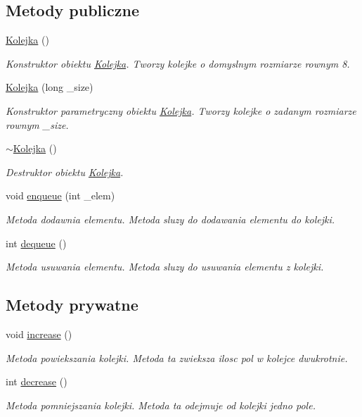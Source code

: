 \subsection*{Metody publiczne}
\begin{DoxyCompactItemize}
\item 
\hyperlink{class_kolejka_a37c886fdc73dce62b04da0381dec5484}{Kolejka} ()
\begin{DoxyCompactList}\small\item\em Konstruktor obiektu \hyperlink{class_kolejka}{Kolejka}. Tworzy kolejke o domyslnym rozmiarze rownym 8. \end{DoxyCompactList}\item 
\hyperlink{class_kolejka_ac942cc97bf0d2c30d11611c406acc5a8}{Kolejka} (long \-\_\-size)
\begin{DoxyCompactList}\small\item\em Konstruktor parametryczny obiektu \hyperlink{class_kolejka}{Kolejka}. Tworzy kolejke o zadanym rozmiarze rownym \-\_\-size. \end{DoxyCompactList}\item 
\hyperlink{class_kolejka_a352f86ff08cd47be6c35c60bb0f873a6}{$\sim$\-Kolejka} ()
\begin{DoxyCompactList}\small\item\em Destruktor obiektu \hyperlink{class_kolejka}{Kolejka}. \end{DoxyCompactList}\item 
void \hyperlink{class_kolejka_a8f3b0111e85f517d9eadb8ce996d4471}{enqueue} (int \-\_\-elem)
\begin{DoxyCompactList}\small\item\em Metoda dodawnia elementu. Metoda sluzy do dodawania elementu do kolejki. \end{DoxyCompactList}\item 
int \hyperlink{class_kolejka_af23261614bcf242a1934a99688a2debc}{dequeue} ()
\begin{DoxyCompactList}\small\item\em Metoda usuwania elementu. Metoda sluzy do usuwania elementu z kolejki. \end{DoxyCompactList}\end{DoxyCompactItemize}
\subsection*{Metody prywatne}
\begin{DoxyCompactItemize}
\item 
void \hyperlink{class_kolejka_ab4f51f0ec7fef36a85af6cfd1c257427}{increase} ()
\begin{DoxyCompactList}\small\item\em Metoda powiekszania kolejki. Metoda ta zwieksza ilosc pol w kolejce dwukrotnie. \end{DoxyCompactList}\item 
int \hyperlink{class_kolejka_acff09ebfbec69b06c91203bab30d815d}{decrease} ()
\begin{DoxyCompactList}\small\item\em Metoda pomniejszania kolejki. Metoda ta odejmuje od kolejki jedno pole. \end{DoxyCompactList}\end{DoxyCompactItemize}

